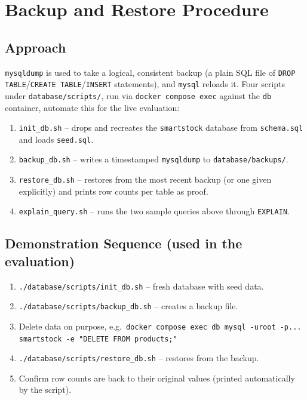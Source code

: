 \documentclass[11pt,a4paper]{report}
\begin{document}
\chapter{Backup and Restore Procedure}

\section{Approach}
\texttt{mysqldump} is used to take a logical, consistent backup (a plain SQL
file of \texttt{DROP TABLE}/\texttt{CREATE TABLE}/\texttt{INSERT}
statements), and \texttt{mysql} reloads it. Four scripts under
\texttt{database/scripts/}, run via \texttt{docker compose exec} against the
\texttt{db} container, automate this for the live evaluation:

\begin{enumerate}[leftmargin=1.4em]
  \item \texttt{init\_db.sh} -- drops and recreates the \texttt{smartstock}
  database from \texttt{schema.sql} and loads \texttt{seed.sql}.
  \item \texttt{backup\_db.sh} -- writes a timestamped \texttt{mysqldump} to
  \texttt{database/backups/}.
  \item \texttt{restore\_db.sh} -- restores from the most recent backup (or
  one given explicitly) and prints row counts per table as proof.
  \item \texttt{explain\_query.sh} -- runs the two sample queries above
  through \texttt{EXPLAIN}.
\end{enumerate}

\section{Demonstration Sequence (used in the evaluation)}
\begin{enumerate}[leftmargin=1.4em]
  \item \texttt{./database/scripts/init\_db.sh} -- fresh database with seed data.
  \item \texttt{./database/scripts/backup\_db.sh} -- creates a backup file.
  \item Delete data on purpose, e.g.\ \texttt{docker compose exec db mysql -uroot -p... smartstock -e "DELETE FROM products;"}
  \item \texttt{./database/scripts/restore\_db.sh} -- restores from the backup.
  \item Confirm row counts are back to their original values (printed
  automatically by the script).
\end{enumerate}
\end{document}
